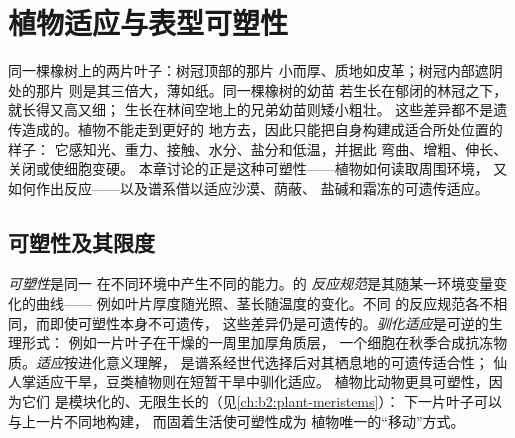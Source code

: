 \chapter{植物适应与表型可塑性}\label{ch:b2:plant-plasticity}

同一棵橡树上的两片叶子：树冠顶部的那片
小而厚、质地如皮革；树冠内部遮阴处的那片
则是其三倍大，薄如纸。同一棵橡树的幼苗
若生长在郁闭的林冠之下，就长得又高又细；
生长在林间空地上的兄弟幼苗则矮小粗壮。
这些差异都不是遗传造成的。植物不能走到更好的
地方去，因此只能把自身构建成适合所处位置的样子：
它感知光、重力、接触、水分、盐分和低温，并据此
弯曲、增粗、伸长、关闭或使细胞变硬。
本章讨论的正是这种可塑性——植物如何读取周围环境，
又如何作出反应——以及谱系借以适应沙漠、荫蔽、
盐碱和霜冻的可遗传适应。

\section{可塑性及其限度}

\begin{definition}[表型可塑性与反应规范]\label{def:b2:plant-plasticity:plasticity}
\emph{可塑性}是同一
在不同环境中产生不同的能力。的
\emph{反应规范}是其随某一环境变量变化的曲线——
例如叶片厚度随光照、茎长随温度的变化。不同
的反应规范各不相同，而即使可塑性本身不可遗传，
这些差异仍是可遗传的。\emph{驯化适应}是可逆的生理形式：
例如一片叶子在干燥的一周里加厚角质层，
一个细胞在秋季合成抗冻物质。\emph{适应}按进化意义理解，
是谱系经世代选择后对其栖息地的可遗传适合性；
仙人掌适应干旱，豆类植物则在短暂干旱中驯化适应。
植物比动物更具可塑性，因为它们
是模块化的、无限生长的（见\cref{ch:b2:plant-meristems}）：
下一片叶子可以与上一片不同地构建，
而固着生活使可塑性成为
植物唯一的“移动”方式。
\end{definition}

